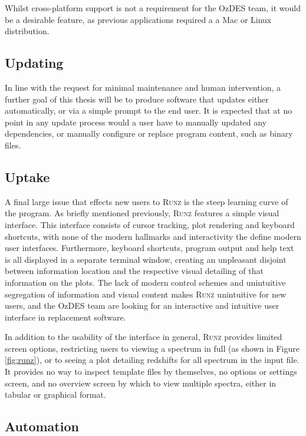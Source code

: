\documentclass[titlesmallcaps, examinerscopy, copyrightpage]{uqthesis}
\newcommand{\runz}{\textsc{Runz}}
\begin{document}
Whilst cross-platform support is not a requirement for the OzDES team, it would be a desirable feature, as previous applications required a a Mac or Linux distribution.

\subsection{Updating}

In line with the request for minimal maintenance and human intervention, a further goal of this thesis will be to produce software that updates either automatically, or via a simple prompt to the end user. It is expected that at no point in any update process would a user have to manually updated any dependencies, or manually configure or replace program content, such as binary files.

\subsection{Uptake}

A final large issue that effects new users to \textsc{Runz} is the steep learning curve of the program. As briefly mentioned previously, \runz{} features a simple visual interface. This interface consists of cursor tracking, plot rendering and keyboard shortcuts, with none of the modern hallmarks and interactivity the define modern user interfaces. Furthermore, keyboard shortcuts, program output and help text is all displayed in a separate terminal window, creating an unpleasant disjoint between information location and the respective visual detailing of that information on the plots. The lack of modern control schemes and unintuitive segregation of information and visual content makes \runz{} unintuitive for new users, and the OzDES team are looking for an interactive and intuitive user interface in replacement software.

In addition to the usability of the interface in general, \runz{} provides limited screen options, restricting users to viewing a spectrum in full (as shown in Figure \ref{fig:runz}), or to seeing a plot detailing redshifts for all spectrum in the input file. It provides no way to inspect template files by themselves, no options or settings screen, and no overview screen by which to view multiple spectra, either in tabular or graphical format.

\subsection{Automation}
\end{document}

